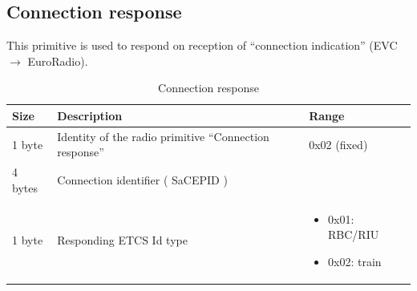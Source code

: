 \documentclass[nocc]{template/openetcs_report}
\begin{document}
\subsection{Connection response}
This primitive is used to respond on reception of "`connection indication"' (EVC $\rightarrow$ EuroRadio).
			\begin{longtable}{|l|l|l|}
				\caption{Connection response}\\ 
				\hline
				
					\begin{minipage}[t]{0.1\linewidth} \textbf{Size}	\end{minipage}
				&	\begin{minipage}[t]{0.5\linewidth} \textbf{Description}	\end{minipage}
				&	\begin{minipage}[t]{0.3\linewidth} \textbf{Range} \end{minipage} \\
				
				\hline
					 \begin{minipage}[t]{0.1\linewidth}1 byte \end{minipage}
					&\begin{minipage}[t]{0.6\linewidth}Identity of the radio primitive "`Connection response"'	\end{minipage}
					&\begin{minipage}[t]{0.3\linewidth}0x02 (fixed) \end{minipage} \\
					
				\hline
					 \begin{minipage}[t]{0.1\linewidth}4 bytes \end{minipage}
					&\begin{minipage}[t]{0.6\linewidth}Connection identifier ( SaCEPID )	\end{minipage}
					&\begin{minipage}[t]{0.3\linewidth} \end{minipage} \\
					
				\hline
					 \begin{minipage}[t]{0.1\linewidth}1 byte \end{minipage}
					&\begin{minipage}[t]{0.6\linewidth}Responding ETCS Id type	\end{minipage}
					&\begin{minipage}[t]{0.3\linewidth}
							\begin{itemize}
								\item 0x01: RBC/RIU
								\item 0x02: train
							\end{itemize}						
					  \end{minipage} \\
					

\end{longtable}
\end{document}
